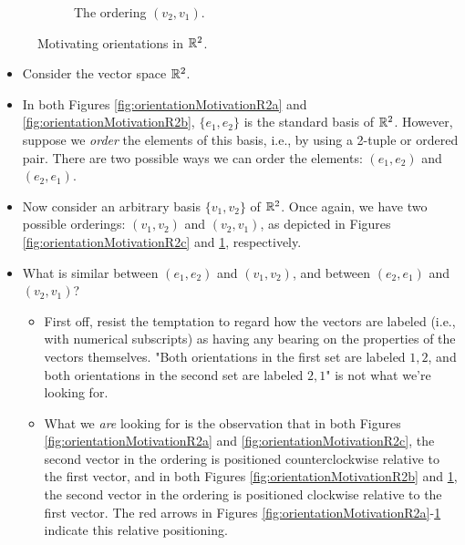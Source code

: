 \documentclass[../notes.tex]{subfiles}
\begin{document}
\begin{itemize}
\begin{figure}[H]
\begin{subfigure}[b]{0.3\linewidth}
            \caption{The ordering $(v_2,v_1)$.}
            \label{fig:orientationMotivationR2d}
        \end{subfigure}
        \caption{Motivating orientations in $\mathbb{R}^2$.}
        \label{fig:orientationMotivationR2}
    \end{figure}
    \begin{itemize}
        \item Consider the vector space $\mathbb{R}^2$.
        \item In both Figures \ref{fig:orientationMotivationR2a} and \ref{fig:orientationMotivationR2b}, $\{e_1,e_2\}$ is the standard basis of $\mathbb{R}^2$. However, suppose we \emph{order} the elements of this basis, i.e., by using a 2-tuple or ordered pair. There are two possible ways we can order the elements: $(e_1,e_2)$ and $(e_2,e_1)$.
        \item Now consider an arbitrary basis $\{v_1,v_2\}$ of $\mathbb{R}^2$. Once again, we have two possible orderings: $(v_1,v_2)$ and $(v_2,v_1)$, as depicted in Figures \ref{fig:orientationMotivationR2c} and \ref{fig:orientationMotivationR2d}, respectively.
        \item What is similar between $(e_1,e_2)$ and $(v_1,v_2)$, and between $(e_2,e_1)$ and $(v_2,v_1)$?
        \begin{itemize}
            \item First off, resist the temptation to regard how the vectors are labeled (i.e., with numerical subscripts) as having any bearing on the properties of the vectors themselves. "Both orientations in the first set are labeled $1,2$, and both orientations in the second set are labeled $2,1$" is not what we're looking for.
            \item What we \emph{are} looking for is the observation that in both Figures \ref{fig:orientationMotivationR2a} and \ref{fig:orientationMotivationR2c}, the second vector in the ordering is positioned counterclockwise relative to the first vector, and in both Figures \ref{fig:orientationMotivationR2b} and \ref{fig:orientationMotivationR2d}, the second vector in the ordering is positioned clockwise relative to the first vector. The red arrows in Figures \ref{fig:orientationMotivationR2a}-\ref{fig:orientationMotivationR2d} indicate this relative positioning.

\end{itemize}
\end{itemize}
\end{itemize}
\end{document}
